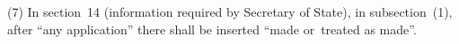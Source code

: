 \documentclass[12pt,a4paper]{article}
\begin{document}
%
%
%
%

(7) In section~14 (information required by Secretary of State), in subsection~(1), after “any application” there shall be inserted “made or~treated as made”.

%
%
%
%
\end{document}
